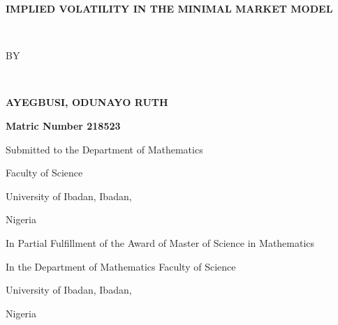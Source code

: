 \documentclass[a4 paper, 12pt]{report}
\theoremstyle{plain}
\begin{document}
	 \baselineskip 29pt
\newcommand{\disp}{\displaystyle}
\thispagestyle{empty}




\begin{center}
	\textbf{\large{IMPLIED VOLATILITY IN THE MINIMAL MARKET MODEL}}
\end{center}
\ \
\begin{center}
	
	BY
\end{center}
\ \
\begin{center}
	\textbf{\large{AYEGBUSI, ODUNAYO RUTH}}
\end{center}
\begin{center}
	\textbf{Matric Number 218523}
\end{center}
\begin{center}
	Submitted to the Department of  Mathematics
\end{center}
\begin{center}
	Faculty of Science  
\end{center}
\begin{center}
	University of Ibadan, Ibadan,  
\end{center}
\begin{center}
	Nigeria  
\end{center}
\begin{center}
	In Partial Fulfillment of the Award of Master of Science in Mathematics
\end{center}
\begin{center}
	In the Department of Mathematics Faculty of Science
\end{center}
\begin{center}
	University of Ibadan, Ibadan,  
\end{center}
\begin{center}
	Nigeria  
\end{center}
\end{document}
